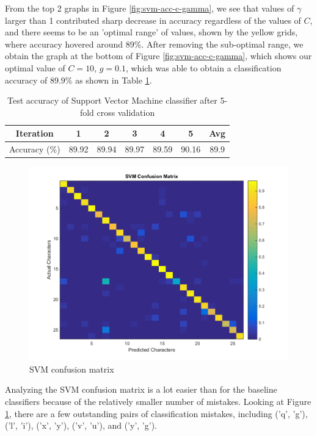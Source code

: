 \documentclass{article} %
\begin{document}
From the top 2 graphs in Figure \ref{fig:svm-acc-c-gamma}, we see that values of $\gamma$ larger than 1 contributed sharp decrease in accuracy regardless of the values of $C$, and there seems to be an 'optimal range' of values, shown by the yellow grids, where accuracy hovered around 89\%. After removing the sub-optimal range, we obtain the graph at the bottom of Figure \ref{fig:svm-acc-c-gamma}, which shows our optimal value of $C=10$, $g=0.1$, which was able to obtain a classification accuracy of $89.9\%$ as shown in Table \ref{tab:svm-cross-val}.

\begin{table}[h]
\centering
\begin{tabular}{|c|c|c|c|c|c|c|}
\hline
Iteration & 1 & 2 & 3 & 4 & 5 & Avg \\
\hline 
Accuracy (\%) & 89.92 & 89.94 & 89.97 & 89.59 & 90.16 & 89.9 \\
\hline 
\end{tabular}
\caption{Test accuracy of Support Vector Machine classifier after 5-fold cross validation}
\label{tab:svm-cross-val}
\end{table}

\begin{figure}[h]
\begin{center}
\includegraphics[scale=0.3]{confusion_svm.png}
\end{center}
\caption{SVM confusion matrix}
\label{fig:svm-conf-mat}
\end{figure}

Analyzing the SVM confusion matrix is a lot easier than for the baseline classifiers because of the relatively smaller number of mistakes. Looking at Figure \ref{fig:svm-conf-mat}, there are a few outstanding pairs of classification mistakes, including ('q', 'g'), ('l', 'i'), ('x', 'y'), ('v', 'u'), and ('y', 'g').
\end{document}
